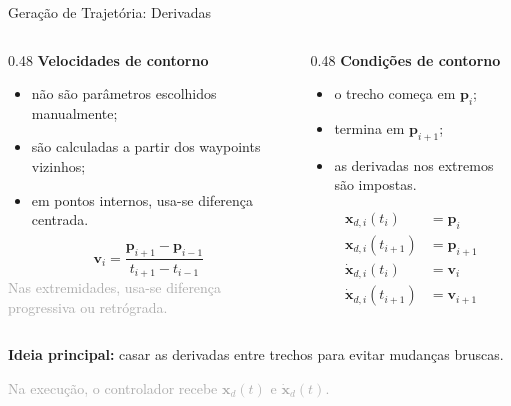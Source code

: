 \documentclass[aspectratio=169]{beamer}
\newcommand{\smalltag}[1]{\textcolor{darkgray}{\scriptsize #1}}
\begin{document}
\begin{frame}{Geração de Trajetória: Derivadas}
    \begin{columns}[T]
        \begin{column}{0.48\textwidth}
            \textbf{Velocidades de contorno}
            \begin{itemize}
                \item não são parâmetros escolhidos manualmente;
                \item são calculadas a partir dos waypoints vizinhos;
                \item em pontos internos, usa-se diferença centrada.
            \end{itemize}

            \[
                \mathbf{v}_i =
                \frac{\mathbf{p}_{i+1}-\mathbf{p}_{i-1}}
                {t_{i+1}-t_{i-1}}
            \]
            \smalltag{Nas extremidades, usa-se diferença progressiva ou retrógrada.}
        \end{column}
        \begin{column}{0.48\textwidth}
            \textbf{Condições de contorno}
            \begin{itemize}
                \item o trecho começa em $\mathbf{p}_i$;
                \item termina em $\mathbf{p}_{i+1}$;
                \item as derivadas nos extremos são impostas.
            \end{itemize}

            \[
                \begin{aligned}
                    \mathbf{x}_{d,i}(t_i) &= \mathbf{p}_i\\
                    \mathbf{x}_{d,i}(t_{i+1}) &= \mathbf{p}_{i+1}\\
                    \dot{\mathbf{x}}_{d,i}(t_i) &= \mathbf{v}_i\\
                    \dot{\mathbf{x}}_{d,i}(t_{i+1}) &= \mathbf{v}_{i+1}
                \end{aligned}
            \]
        \end{column}
    \end{columns}

    \vspace{0.15cm}
    \begin{center}
        \textbf{Ideia principal:} casar as derivadas entre trechos para evitar mudanças bruscas.

        \smalltag{Na execução, o controlador recebe $\mathbf{x}_d(t)$ e $\dot{\mathbf{x}}_d(t)$.}
    \end{center}
\end{frame}
\end{document}
